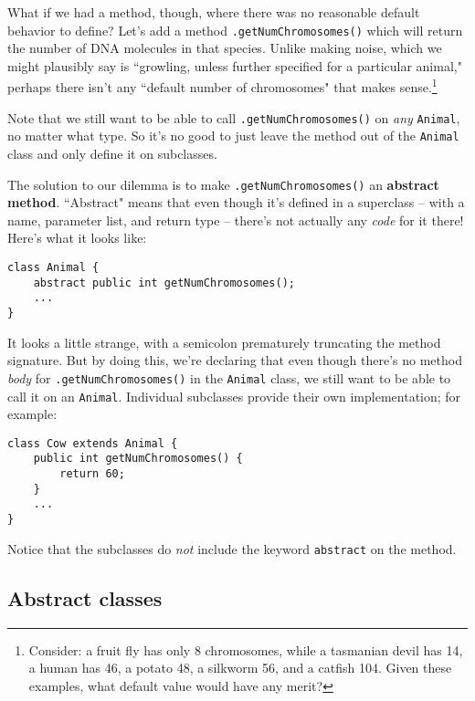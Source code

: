 What if we had a method, though, where there was no reasonable default
behavior to define? Let's add a method \texttt{.getNumChromosomes()} which
will return the number of DNA molecules in that species. Unlike making noise,
which we might plausibly say is ``growling, unless further specified for a
particular animal," perhaps there isn't any ``default number of chromosomes"
that makes sense.\footnote{Consider: a fruit fly has only 8 chromosomes, while
a tasmanian devil has 14, a human has 46, a potato 48, a silkworm 56, and a
catfish 104. Given these examples, what default value would have any merit?}

Note that we still want to be able to call \texttt{.getNumChromosomes()} on
\textit{any} \texttt{Animal}, no matter what type. So it's no good to just
leave the method out of the \texttt{Animal} class and only define it on
subclasses.

\begin{samepage}
The solution to our dilemma is to make \texttt{.getNumChromosomes()} an
\textbf{abstract method}. ``Abstract" means that even though it's defined in a
superclass -- with a name, parameter list, and return type -- there's not
actually any \textit{code} for it there! Here's what it looks like:

\begin{verbatim}
class Animal {
    abstract public int getNumChromosomes();
    ...
}
\end{verbatim}
\end{samepage}

\begin{samepage}
It looks a little strange, with a semicolon prematurely truncating the method
signature. But by doing this, we're declaring that even though there's no
method \textit{body} for \texttt{.getNumChromosomes()} in the \texttt{Animal}
class, we still want to be able to call it on an \texttt{Animal}. Individual 
subclasses provide their own implementation; for example:

\begin{verbatim}
class Cow extends Animal {
    public int getNumChromosomes() {
        return 60;
    }
    ...
}
\end{verbatim}
\end{samepage}

Notice that the subclasses do \textit{not} include the keyword \texttt{abstract}
on the method.

\subsection{Abstract classes}

